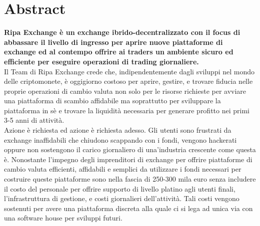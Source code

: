 \documentclass[11pt,fleqn,oneside]{book} %
\begin{document}

\begingroup
\thispagestyle{empty}
\endgroup

\newpage

\usechapterimagefalse %
\chapter{Abstract}
\textbf{Ripa Exchange è un exchange ibrido-decentralizzato con il focus di abbassare il livello di ingresso per aprire 
nuove piattaforme di exchange ed al contempo offrire ai traders un ambiente sicuro ed efficiente per eseguire operazioni di 
trading giornaliere.}\\

Il Team di Ripa Exchange crede che, indipendentemente dagli sviluppi nel mondo delle criptomonete, è oggigiorno costoso per aprire,
gestire, e trovare fiducia nelle proprie operazioni di cambio valuta non solo per le risorse richieste per avviare
una piattaforma di scambio affidabile ma soprattutto per sviluppare la piattaforma in sè e trovare la liquidità 
necessaria per generare profitto nei primi 3-5 anni di attività.\\

Azione è richiesta ed azione è richiesta adesso. Gli utenti sono frustrati da exchange inaffidabili che chiudono scappando con i 
fondi, vengono hackerati oppure non sostengono il carico giornaliero di una'industria crescente come questa è.
Nonostante l'impegno degli imprenditori di exchange per offrire piattaforme di cambio valuta efficienti, affidabili e 
semplici da utilizzare i fondi necessari per costruire queste piattaforme sono nella fascia di 250-300 mila euro senza includere
il costo del personale per offrire supporto di livello platino agli utenti finali, l'infrastruttura di gestione, e costi giornalieri
dell'attività. Tali costi vengono sostenuti per avere una piattaforma discreta alla quale ci si lega ad unica via con una software
house per sviluppi futuri.\\
\end{document}
